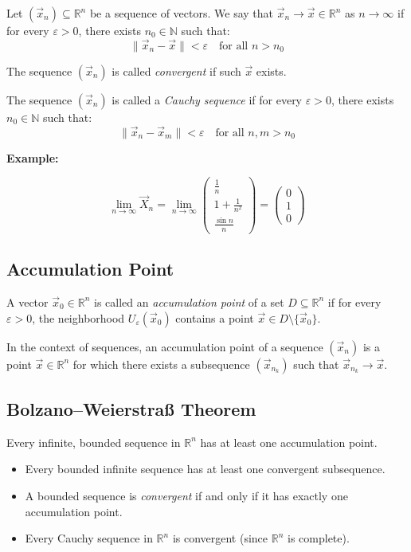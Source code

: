 Let \( (\vec{x}_n) \subseteq \mathbb{R}^n \) be a sequence of vectors. We say that \( \vec{x}_n \to \vec{x} \in \mathbb{R}^n \) as \( n \to \infty \) if for every \( \varepsilon > 0 \), there exists \( n_0 \in \mathbb{N} \) such that:
\[
\|\vec{x}_n - \vec{x}\| < \varepsilon \quad \text{for all } n > n_0
\]

The sequence \( (\vec{x}_n) \) is called \emph{convergent} if such \( \vec{x} \) exists.

The sequence \( (\vec{x}_n) \) is called a \emph{Cauchy sequence} if for every \( \varepsilon > 0 \), there exists \( n_0 \in \mathbb{N} \) such that:
\[
\|\vec{x}_n - \vec{x}_m\| < \varepsilon \quad \text{for all } n, m > n_0
\]

\textbf{Example: }

\[
\lim_{n \to \infty} \vec{X}_n = \lim_{n \to \infty} \begin{pmatrix} \frac{1}{n} \\
1 + \frac{1}{n^2} \\ \frac{\sin n}{n}\end{pmatrix} = \begin{pmatrix}
    0 \\ 1 \\ 0
\end{pmatrix}
\]

\subsection{Accumulation Point}

A vector \( \vec{x}_0 \in \mathbb{R}^n \) is called an \emph{accumulation point} of a set \( D \subseteq \mathbb{R}^n \) if for every \( \varepsilon > 0 \), the neighborhood \( U_\varepsilon(\vec{x}_0) \) contains a point \( \vec{x} \in D \setminus \{\vec{x}_0\} \).

In the context of sequences, an accumulation point of a sequence \( (\vec{x}_n) \) is a point \( \vec{x} \in \mathbb{R}^n \) for which there exists a subsequence \( (\vec{x}_{n_k}) \) such that \( \vec{x}_{n_k} \to \vec{x} \).

\subsection{Bolzano–Weierstraß Theorem}

Every infinite, bounded sequence in \( \mathbb{R}^n \) has at least one accumulation point.

\begin{itemize}[label=\(-\)]
\item Every bounded infinite sequence has at least one convergent subsequence.
\item A bounded sequence is \emph{convergent} if and only if it has exactly one accumulation point.
\item Every Cauchy sequence in \( \mathbb{R}^n \) is convergent (since \( \mathbb{R}^n \) is complete).
\end{itemize}

